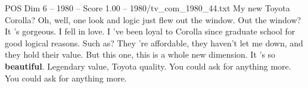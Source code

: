 \begin{textsample}{POS Dim 6 – 1980 – Score 1.00 – 1980/tv\_com\_1980\_44.txt}  \label{ex:f6_pos_056}
My new Toyota Corolla?
Oh, well, one look and logic just flew out the window.
Out the window?
It 's gorgeous.
I fell in love.
I 've been loyal to Corolla since graduate school for good logical reasons.
Such as?
They 're affordable, they haven't let me down, and they hold their value.
But this one, this is a whole new dimension.
It 's so \textbf{beautiful}.
Legendary value, Toyota quality.
You could ask for anything more.
You could ask for anything more.

\end{textsample}
